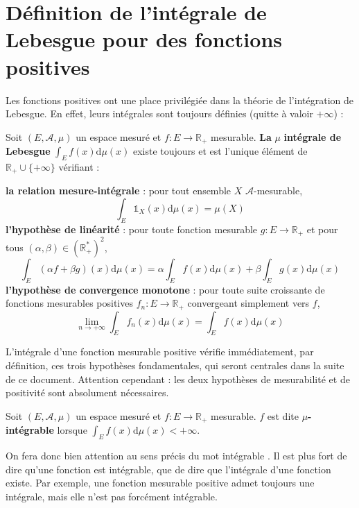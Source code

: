 \documentclass[../integ-proba.tex]{subfiles}
\begin{document}
  \section{Définition de l'intégrale de Lebesgue pour des fonctions positives}
  \label{sect:defintpos}
  Les fonctions positives ont une place privilégiée dans la théorie de l'intégration de Lebesgue.
  En effet, leurs intégrales sont toujours définies (quitte à valoir $+\infty$) :

  \begin{defi}
    Soit $\left(E,\mathcal{A},\mu\right)$ un espace mesuré et $f:E\rightarrow\mathbb{R}_+$ mesurable.
    \textbf{La} $\mu $\textbf{ intégrale de Lebesgue } $\displaystyle\int_Ef(x)\text{d}\mu(x)$ existe toujours et est l'unique élément de $\mathbb{R}_+\cup\{+\infty\}$ vérifiant :
    \begin{itemize}
      \itemb \textbf{la relation mesure-intégrale} : pour tout ensemble $X$ $\mathcal{A}$-mesurable,
      $$
      \int_E\mathds{1}_X(x)\text{d}\mu(x)=\mu(X)
      $$
      \itemb \textbf{l'hypothèse de linéarité} : pour toute fonction mesurable $g:E\rightarrow\mathbb{R}_+$ et pour tous $\left(\alpha,\beta\right) \in \left(\mathbb{R}_+^*\right)^2$,
      $$
      \int_E (\alpha f + \beta g)(x) \text{d}\mu(x)=\alpha\int_Ef(x)\text{d}\mu(x) + \beta\int_Eg(x)\text{d}\mu(x)
      $$
      \itemb \textbf{l'hypothèse de convergence monotone} : pour toute suite croissante de fonctions mesurables positives $f_n:E\rightarrow\mathbb{R}_+$ convergeant simplement vers $f$,
      $$
      \lim_{n\rightarrow+\infty}\int_Ef_n(x)\text{d}\mu(x)=\int_Ef(x)\text{d}\mu(x)
      $$
    \end{itemize}
  \end{defi}

  \begin{rem}
    L'intégrale d'une fonction mesurable positive vérifie immédiatement, par définition, ces trois hypothèses fondamentales, qui seront centrales dans la suite de ce document.
    Attention cependant : les deux hypothèses de mesurabilité et de positivité sont absolument nécessaires.
  \end{rem}

  \begin{defi}
    Soit $\left(E,\mathcal{A},\mu\right)$ un espace mesuré et $f:E\rightarrow\mathbb{R}_+$ mesurable.
    $f$ est dite $\mu$\textbf{-intégrable} lorsque $\displaystyle\int_Ef(x)\text{d}\mu(x) < +\infty$.
  \end{defi}

  \begin{rem}
    \label{rem:attint}
    On fera donc bien attention au sens précis du mot \og intégrable \fg.
    Il est plus fort de dire qu'une fonction est intégrable, que de dire que l'intégrale d'une fonction existe.
    Par exemple, une fonction mesurable positive admet toujours une intégrale, mais elle n'est pas forcément intégrable.
  \end{rem}
\end{document}
